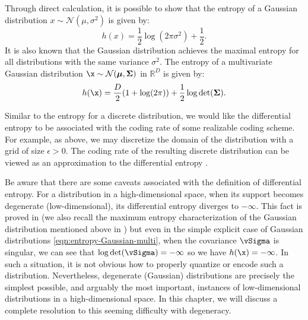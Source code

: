 \documentclass[../../book-main.tex]{subfiles}
\begin{document}
\begin{example}
	Through direct calculation, it is possible to show that the entropy of a Gaussian distribution $x \sim \mathcal{N}(\mu, \sigma^2)$ is given by:
	\begin{equation}
		h(x) = \frac{1}{2}\log (2\pi \sigma^2) + \frac{1}{2}.
		\label{eqn:entropy-Gaussian}
	\end{equation}
	It is also known that the Gaussian distribution achieves the maximal entropy
	for all distributions with the same variance $\sigma^2$. The entropy of a multivariate Gaussian distribution $\x \sim \mathcal{N}(\boldsymbol{\mu}, \boldsymbol{\Sigma})$ in $\mathbb{R}^D$ is given by:
	\begin{equation}
		h(\x) = \frac{D}{2}(1 + \log(2\pi)) + \frac{1}{2}\log\det(\boldsymbol{\Sigma}).
		\label{eqn:entropy-Gaussian-multi}
	\end{equation}
\end{example}

Similar to the entropy for a discrete distribution, we would like the
differential entropy to be associated with the coding rate of some realizable
coding scheme. For example, as above, we may discretize the domain of the distribution with a grid of size $\epsilon >0$. The coding rate of the resulting discrete distribution can be viewed as an approximation to the differential entropy \cite{Cover-Thomas}.


Be aware that there are some caveats associated with the definition of
differential entropy. For a distribution in a high-dimensional space, when its
support becomes degenerate (low-dimensional), its differential entropy diverges
to \(-\infty\). This fact is proved in
 (we also recall the
maximum entropy characterization of the Gaussian distribution mentioned above in
) but even in the simple explicit case of Gaussian
distributions \eqref{eqn:entropy-Gaussian-multi}, when the covariance
\(\vSigma\) is singular, we can see that \(\log\det(\vSigma) = -\infty\) so we have $h(\x) = -\infty$. In such a situation, it is not obvious how to properly quantize or encode such a distribution. Nevertheless, degenerate (Gaussian) distributions are precisely the simplest possible, and arguably the most important, instances of low-dimensional distributions in a high-dimensional space. In this chapter, we will discuss a complete resolution to this seeming difficulty with degeneracy.
\end{document}
